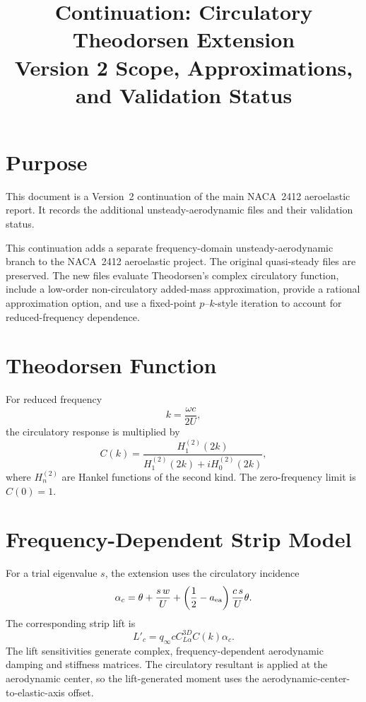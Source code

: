 \documentclass[11pt]{article}
\title{Continuation: Circulatory Theodorsen Extension\\[4pt]
\large Version 2 Scope, Approximations, and Validation Status}
\author{}
\date{}
\begin{document}
\maketitle

\section{Purpose}

This document is a Version~2 continuation of the main NACA~2412 aeroelastic report.
It records the additional unsteady-aerodynamic files and their validation status.

This continuation adds a separate frequency-domain unsteady-aerodynamic branch to the
NACA~2412 aeroelastic project. The original quasi-steady files are preserved. The new
files evaluate Theodorsen's complex circulatory function, include a low-order
non-circulatory added-mass approximation, provide a rational approximation option, and
use a fixed-point $p$--$k$-style iteration to account for reduced-frequency dependence.

\section{Theodorsen Function}

For reduced frequency
\begin{equation}
 k=\frac{\omega c}{2U},
\end{equation}
the circulatory response is multiplied by
\begin{equation}
 C(k)=
 \frac{H_1^{(2)}(2k)}
 {H_1^{(2)}(2k)+iH_0^{(2)}(2k)},
\end{equation}
where $H_n^{(2)}$ are Hankel functions of the second kind. The zero-frequency limit is
$C(0)=1$.

\section{Frequency-Dependent Strip Model}

For a trial eigenvalue $s$, the extension uses the circulatory incidence
\begin{equation}
 \alpha_c =
 \theta+\frac{s\,w}{U}
 +\left(\frac{1}{2}-a_{\rm ea}\right)
 \frac{c\,s}{U}\theta .
\end{equation}
The corresponding strip lift is
\begin{equation}
 L'_c=q_\infty c C_{L\alpha}^{3D} C(k)\alpha_c.
\end{equation}
The lift sensitivities generate complex, frequency-dependent aerodynamic damping and
stiffness matrices. The circulatory resultant is applied at the aerodynamic center, so
the lift-generated moment uses the aerodynamic-center-to-elastic-axis offset.
\end{document}
